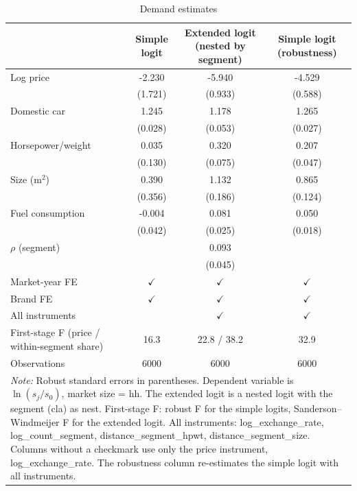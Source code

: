 \begin{table}[htbp]
\centering
\caption{Demand estimates}
\label{tab:demand_models}
\begin{tabular}{lccc}
\toprule
 & Simple logit & Extended logit (nested by segment) & Simple logit (robustness) \\
\midrule
Log price & -2.230 & -5.940 & -4.529 \\
 & (1.721) & (0.933) & (0.588) \\
Domestic car & 1.245 & 1.178 & 1.265 \\
 & (0.028) & (0.053) & (0.027) \\
Horsepower/weight & 0.035 & 0.320 & 0.207 \\
 & (0.130) & (0.075) & (0.047) \\
Size (m$^2$) & 0.390 & 1.132 & 0.865 \\
 & (0.356) & (0.186) & (0.124) \\
Fuel consumption & -0.004 & 0.081 & 0.050 \\
 & (0.042) & (0.025) & (0.018) \\
$\rho$ (segment) &  & 0.093 &  \\
 &  & (0.045) &  \\
\midrule
Market-year FE & $\checkmark$ & $\checkmark$ & $\checkmark$ \\
Brand FE & $\checkmark$ & $\checkmark$ & $\checkmark$ \\
All instruments &  & $\checkmark$ & $\checkmark$ \\
First-stage F (price / within-segment share) & 16.3 & 22.8 / 38.2 & 32.9 \\
Observations & 6000 & 6000 & 6000 \\
\bottomrule
\multicolumn{4}{p{0.9\linewidth}}{\footnotesize \textit{Note:} Robust standard errors in parentheses. Dependent variable is $\ln(s_j/s_0)$, market size = hh. The extended logit is a nested logit with the segment (cla) as nest. First-stage F: robust F for the simple logits, Sanderson--Windmeijer F for the extended logit. All instruments: log\_exchange\_rate, log\_count\_segment, distance\_segment\_hpwt, distance\_segment\_size. Columns without a checkmark use only the price instrument, log\_exchange\_rate. The robustness column re-estimates the simple logit with all instruments.} \\
\end{tabular}
\end{table}
